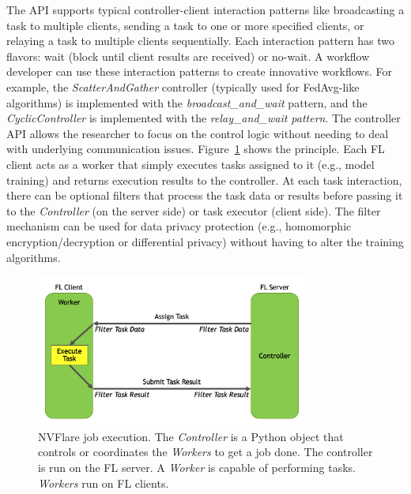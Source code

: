 \documentclass[11pt]{article}
\begin{document}
The API supports typical controller-client interaction patterns like broadcasting a task to multiple clients, sending a task to one or more specified clients, or relaying a task to multiple clients sequentially. Each interaction pattern has two flavors: wait (block until client results are received) or no-wait. A workflow developer can use these interaction patterns to create innovative workflows. For example, the \textit{ScatterAndGather} controller (typically used for FedAvg-like algorithms) is implemented with the \textit{broadcast\_and\_wait} pattern, and the \textit{CyclicController} is implemented with the \textit{relay\_and\_wait pattern}. The controller API allows the researcher to focus on the control logic without needing to deal with underlying communication issues. Figure~\ref{fig:job} shows the principle.
%
Each FL client acts as a worker that simply executes tasks assigned to it (e.g., model training) and returns execution results to the controller. At each task interaction, there can be optional filters that process the task data or results before passing it to the \textit{Controller} (on the server side) or task executor (client side). The filter mechanism can be used for data privacy protection (e.g., homomorphic encryption/decryption or differential privacy) without having to alter the training algorithms.

\begin{figure}[htbp]
    \centering
    \includegraphics[width=0.8\textwidth]{submissions/HolgerRoth/fig/controller_worker_flow.png}
    \caption{NVFlare job execution. The \textit{Controller} is a Python object that controls or coordinates the \textit{Workers} to get a job done. The controller is run on the FL server. A \textit{Worker} is capable of performing tasks. \textit{Workers} run on FL clients. \label{fig:job}}
\end{figure}
\end{document}
